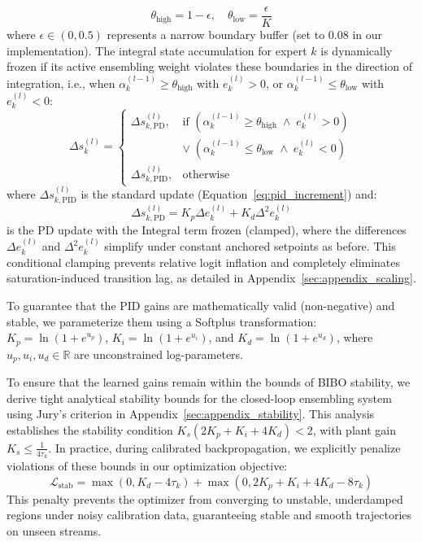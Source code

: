 \begin{equation}
\theta_{\text{high}} = 1 - \epsilon, \quad \theta_{\text{low}} = \frac{\epsilon}{K}
\label{eq:clamping_thresholds}
\end{equation}
where $\epsilon \in (0, 0.5)$ represents a narrow boundary buffer (set to $0.08$ in our implementation). The integral state accumulation for expert $k$ is dynamically frozen if its active ensembling weight violates these boundaries in the direction of integration, i.e., when $\alpha_k^{(l-1)} \ge \theta_{\text{high}}$ with $e_k^{(l)} > 0$, or $\alpha_k^{(l-1)} \le \theta_{\text{low}}$ with $e_k^{(l)} < 0$:
\begin{equation}
\Delta s_k^{(l)} = \begin{cases} \Delta s_{k,\text{PD}}^{(l)}, & \text{if } \left(\alpha_k^{(l-1)} \ge \theta_{\text{high}} \;\land\; e_k^{(l)} > 0\right) \\
& \lor\; \left(\alpha_k^{(l-1)} \le \theta_{\text{low}} \;\land\; e_k^{(l)} < 0\right) \\
\Delta s_{k,\text{PID}}^{(l)}, & \text{otherwise} \end{cases}
\label{eq:clamping}
\end{equation}
where $\Delta s_{k,\text{PID}}^{(l)}$ is the standard update (Equation~\ref{eq:pid_increment}) and:
\[
\Delta s_{k,\text{PD}}^{(l)} = K_p \Delta e_k^{(l)} + K_d \Delta^2 e_k^{(l)}
\]
is the PD update with the Integral term frozen (clamped), where the differences $\Delta e_k^{(l)}$ and $\Delta^2 e_k^{(l)}$ simplify under constant anchored setpoints as before. This conditional clamping prevents relative logit inflation and completely eliminates saturation-induced transition lag, as detailed in Appendix~\ref{sec:appendix_scaling}.

To guarantee that the PID gains are mathematically valid (non-negative) and stable, we parameterize them using a Softplus transformation: $K_p = \ln(1 + e^{u_p})$, $K_i = \ln(1 + e^{u_i})$, and $K_d = \ln(1 + e^{u_d})$, where $u_p, u_i, u_d \in \mathbb{R}$ are unconstrained log-parameters.

To ensure that the learned gains remain within the bounds of BIBO stability, we derive tight analytical stability bounds for the closed-loop ensembling system using Jury's criterion in Appendix~\ref{sec:appendix_stability}. This analysis establishes the stability condition $K_s(2K_p + K_i + 4K_d) < 2$, with plant gain $K_s \le \frac{1}{4\tau_k}$. In practice, during calibrated backpropagation, we explicitly penalize violations of these bounds in our optimization objective:
\begin{equation}
\mathcal{L}_{\text{stab}} = \max(0, K_d \!-\! 4\tau_k) \!+\! \max(0, 2K_p \!+\! K_i \!+\! 4K_d \!-\! 8\tau_k)
\label{eq:stability_penalty}
\end{equation}
This penalty prevents the optimizer from converging to unstable, underdamped regions under noisy calibration data, guaranteeing stable and smooth trajectories on unseen streams.

